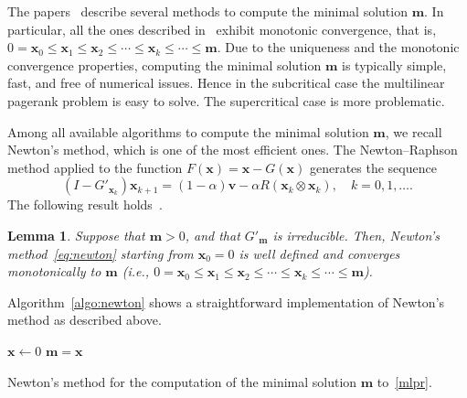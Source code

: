 \documentclass[10pt]{paper}
\DeclarePairedDelimiter{\norm}{\lVert}{\rVert}
\newtheorem{lemma}[theorem]{Lemma}
\begin{document}
The papers~\cite{BinMP11,MeiP11,Pol13} describe several methods to compute the minimal solution ${\mathbf{m}}$. In particular, all the ones described in~\cite{Pol13} exhibit monotonic convergence, that is, $0 = {\mathbf{x}}_0 \leq {\mathbf{x}}_1 \leq {\mathbf{x}}_2 \leq \cdots \leq {\mathbf{x}}_k \leq \cdots \leq {\mathbf{m}}$. Due to the uniqueness and the monotonic convergence properties, computing the minimal solution ${\mathbf{m}}$ is typically simple, fast, and free of numerical issues. Hence in the subcritical case the multilinear pagerank problem is easy to solve. The supercritical case is more problematic.

Among all available algorithms to compute the minimal solution ${\mathbf{m}}$, we recall Newton's method, which is one of the most efficient ones. The Newton--Raphson method applied to the function $F({\mathbf{x}}) = {\mathbf{x}} - G({\mathbf{x}})$ generates the sequence
	\begin{equation}\label{eq:newton}
		(I-G'_{{\mathbf{x}}_k}){\mathbf{x}}_{k+1} = (1-\alpha) {\mathbf{v}} - \alpha R({\mathbf{x}}_k \otimes {\mathbf{x}}_k), \quad k=0,1,\dots.
	\end{equation}
The following result holds~\cite[Theorem~13]{Pol13}.
\begin{lemma}
	Suppose that ${\mathbf{m}} > 0$, and that $G'_{\mathbf{m}}$ is irreducible. Then, Newton's method~\eqref{eq:newton} starting from ${\mathbf{x}}_0=0$ is well defined and converges monotonically to ${\mathbf{m}}$ (i.e., $0 = {\mathbf{x}}_0 \leq {\mathbf{x}}_1 \leq {\mathbf{x}}_2 \leq \cdots \leq {\mathbf{x}}_k \leq \cdots \leq {\mathbf{m}}$).
\end{lemma}
Algorithm~\eqref{algo:newton} shows a straightforward implementation of Newton's method as described above.
\begin{algorithm}
${\mathbf{x}} \leftarrow 0$\;
${\mathbf{m}} = {\mathbf{x}}$\;
\caption{Newton's method for the computation of the minimal solution ${\mathbf{m}}$ to~\eqref{mlpr}.} \label{algo:newton}
\end{algorithm}
\end{document}
